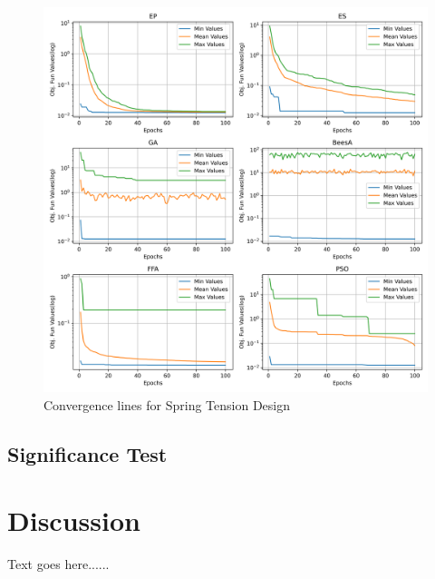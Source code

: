 \documentclass[conference]{IEEEtran}
\begin{document}
\begin{figure}[H]
\centering
\caption{Convergence lines for Spring Tension Design}
\label{fig:spring_problem_convergence}
\includegraphics[width=0.4 \textwidth]{images/spring_problem_convergence.png}
\end{figure}
    
\subsection{Significance Test}
\label{subsec:pressure_vessel_problem_significance_test}

\begin{table}[H]
\centering
\caption{Significance Test Using Friedman Chi-Squared Test}
\label{friedman_test}
\end{table}



\section{Discussion}

Text goes here......
\end{document}
